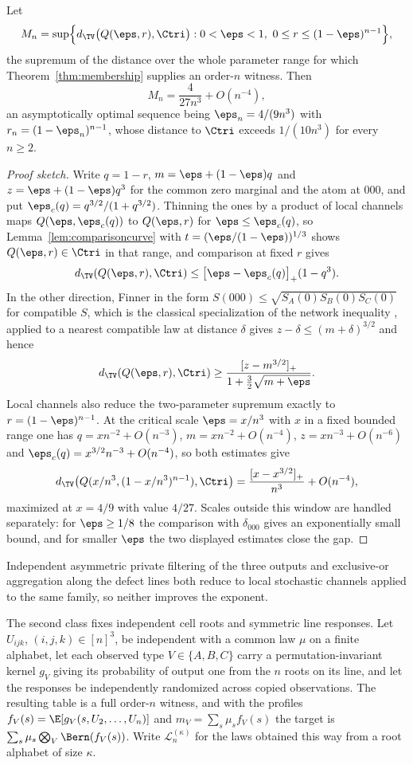 \begin{proposition}\label{prop:defectceiling}
Let
\[
M_n=\sup\Bigl\{d_{\TV}\bigl(Q(\eps,r),\Ctri\bigr):0<\eps<1,\ 0\le r\le(1-\eps)^{n-1}\Bigr\},
\]
the supremum of the distance over the whole parameter range for which Theorem~\ref{thm:membership} supplies an order-$n$ witness. Then
\[
M_n=\frac4{27n^3}+O(n^{-4}),
\]
an asymptotically optimal sequence being $\eps_n=4/(9n^3)$ with $r_n=(1-\eps_n)^{n-1}$, whose distance to $\Ctri$ exceeds $1/(10n^3)$ for every $n\ge2$.
\end{proposition}

\begin{proof}[Proof sketch]
Write $q=1-r$, $m=\eps+(1-\eps)q$ and $z=\eps+(1-\eps)q^3$ for the common zero marginal and the atom at $000$, and put $\eps_c(q)=q^{3/2}/(1+q^{3/2})$. Thinning the ones by a product of local channels maps $Q(\eps,\eps_c(q))$ to $Q(\eps,r)$ for $\eps\le\eps_c(q)$, so Lemma~\ref{lem:comparisoncurve} with $t=(\eps/(1-\eps))^{1/3}$ shows $Q(\eps,r)\in\Ctri$ in that range, and comparison at fixed $r$ gives
\[
d_{\TV}(Q(\eps,r),\Ctri)\le\bigl[\eps-\eps_c(q)\bigr]_+(1-q^3).
\]
In the other direction, Finner \cite{Finner1992} in the form $S(000)\le\sqrt{S_A(0)S_B(0)S_C(0)}$ for compatible $S$, which is the classical specialization of the network inequality \cite{Renou2019}, applied to a nearest compatible law at distance $\delta$ gives $z-\delta\le(m+\delta)^{3/2}$ and hence
\[
d_{\TV}(Q(\eps,r),\Ctri)\ge\frac{[z-m^{3/2}]_+}{1+\tfrac32\sqrt{m+\eps}} .
\]
Local channels also reduce the two-parameter supremum exactly to $r=(1-\eps)^{n-1}$. At the critical scale $\eps=x/n^3$ with $x$ in a fixed bounded range one has $q=xn^{-2}+O(n^{-3})$, $m=xn^{-2}+O(n^{-4})$, $z=xn^{-3}+O(n^{-6})$ and $\eps_c(q)=x^{3/2}n^{-3}+O(n^{-4})$, so both estimates give
\[
d_{\TV}\bigl(Q(x/n^3,(1-x/n^3)^{n-1}),\Ctri\bigr)=\frac{[x-x^{3/2}]_+}{n^3}+O(n^{-4}),
\]
maximized at $x=4/9$ with value $4/27$. Scales outside this window are handled separately: for $\eps\ge1/8$ the comparison with $\delta_{000}$ gives an exponentially small bound, and for smaller $\eps$ the two displayed estimates close the gap.
\end{proof}

Independent asymmetric private filtering of the three outputs and exclusive-or aggregation along the defect lines both reduce to local stochastic channels applied to the same family, so neither improves the exponent.

The second class fixes independent cell roots and symmetric line responses. Let $U_{ijk}$, $(i,j,k)\in[n]^3$, be independent with a common law $\mu$ on a finite alphabet, let each observed type $V\in\{A,B,C\}$ carry a permutation-invariant kernel $g_V$ giving its probability of output one from the $n$ roots on its line, and let the responses be independently randomized across copied observations. The resulting table is a full order-$n$ witness, and with the profiles $f_V(s)=\E[g_V(s,U_2,\dots,U_n)]$ and $m_V=\sum_s\mu_sf_V(s)$ the target is $\sum_s\mu_s\bigotimes_V\Bern(f_V(s))$. Write $\mathcal L_n^{(\kappa)}$ for the laws obtained this way from a root alphabet of size $\kappa$.

